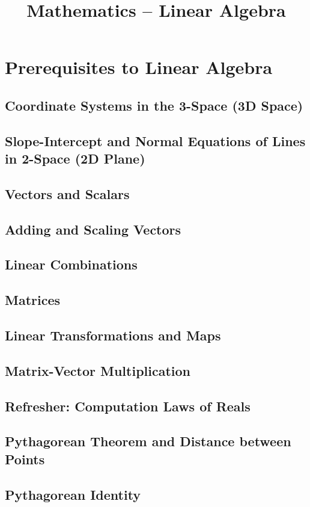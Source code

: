 \documentclass[11pt]{article}
\title{Mathematics -- Linear Algebra}
\author{}
\date{}
\begin{document}
\maketitle

\setcounter{section}{0}
\section{Prerequisites to Linear Algebra}
\subsection{Coordinate Systems in the 3-Space (3D Space)}
\subsection{Slope-Intercept and Normal Equations of Lines in 2-Space (2D Plane)}
\subsection{Vectors and Scalars}
\subsection{Adding and Scaling Vectors}
\subsection{Linear Combinations}
\subsection{Matrices}
\subsection{Linear Transformations and Maps}
\subsection{Matrix-Vector Multiplication}
\subsection{Refresher: Computation Laws of Reals}
\subsection{Pythagorean Theorem and Distance between Points}
\subsection{Pythagorean Identity}
\end{document}
